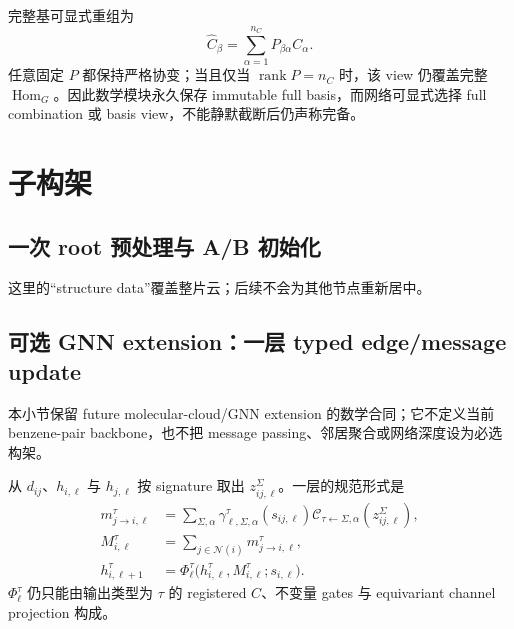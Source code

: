 \documentclass[11pt,a4paper,fontset=fandol]{ctexart}
\newcommand{\Hom}{\operatorname{Hom}}
\newcommand{\rank}{\operatorname{rank}}
\begin{document}
完整基可显式重组为
\begin{equation}
  \widehat C_\beta=\sum_{\alpha=1}^{n_C}P_{\beta\alpha}C_\alpha.
  \label{eq:basis-view}
\end{equation}
任意固定 $P$ 都保持严格协变；当且仅当 $\rank P=n_C$ 时，该 view 仍覆盖完整 $\Hom_G$。因此数学模块永久保存 immutable full basis，而网络可显式选择 full combination 或 basis view，不能静默截断后仍声称完备。

\section{子构架}
\label{sec:subflows}

\subsection{一次 root 预处理与 A/B 初始化}

\begin{center}
\end{center}
这里的“structure data”覆盖整片云；后续不会为其他节点重新居中。

\subsection{可选 GNN extension：一层 typed edge/message update}

本小节保留 future molecular-cloud/GNN extension 的数学合同；它不定义当前 benzene-pair backbone，也不把 message passing、邻居聚合或网络深度设为必选构架。

从 $d_{ij}$、$h_{i,\ell}$ 与 $h_{j,\ell}$ 按 signature 取出
$z_{ij,\ell}^{\Sigma}$。一层的规范形式是
\begin{align}
  m_{j\to i,\ell}^{\tau}
  &=\sum_{\Sigma,\alpha}
  \gamma_{\ell,\Sigma,\alpha}^{\tau}(s_{ij,\ell})
  \mathcal C_{\tau\leftarrow\Sigma,\alpha}
  (z_{ij,\ell}^{\Sigma}),
  \label{eq:message}\\
  M_{i,\ell}^{\tau}
  &=\sum_{j\in\mathcal N(i)}m_{j\to i,\ell}^{\tau},
  \label{eq:aggregate}\\
  h_{i,\ell+1}^{\tau}
  &=\Phi_{\ell}^{\tau}
  \bigl(h_{i,\ell}^{\tau},M_{i,\ell}^{\tau};s_{i,\ell}\bigr).
  \label{eq:update}
\end{align}
$\Phi_\ell^\tau$ 仍只能由输出类型为 $\tau$ 的 registered $C$、不变量 gates 与 equivariant channel projection 构成。
\end{document}
